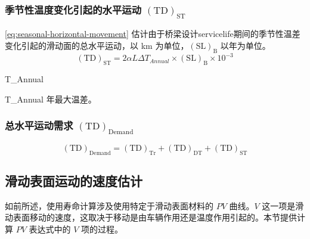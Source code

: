 \subsubsection{季节性温度变化引起的水平运动 $(\text{TD})_\text{ST}$}
\cref{eq:seasonal-horizontal-movement} 估计由于桥梁设计\gls*{servicelife}期间的季节性温差变化引起的滑动面的总水平运动，以 \unit{km} 为单位，$(\text{SL})_\text{B}$ 以年为单位。
\begin{equation}
  \label{eq:seasonal-horizontal-movement}
  (\text{TD})_\text{ST} = 2 \alpha L \Delta T_{Annual} \times (\text{SL})_\text{B} \times 10^{-3}
\end{equation}
\begin{EqDesc}{\Delta T_{Annual}}
  \item[\Delta T_{Annual}] 年最大温差。
\end{EqDesc}


\subsubsection{总水平运动需求 $(\text{TD})_\text{Demand}$}
\begin{equation}
  \label{eq:total-induced-horizontal-movement}
  (\text{TD})_\text{Demand} = (\text{TD})_\text{Tr} + (\text{TD})_\text{DT} +(\text{TD})_\text{ST}
\end{equation}

\subsection{滑动表面运动的速度估计}
\label{subsec:estimate-speed-of-slideing}
如前所述，使用寿命计算涉及使用特定于滑动表面材料的 $PV$ 曲线。$V$ 这一项是滑动表面移动的速度，这取决于移动是由车辆作用还是温度作用引起的。本节提供计算 $PV$ 表达式中的 $V$ 项的过程。

